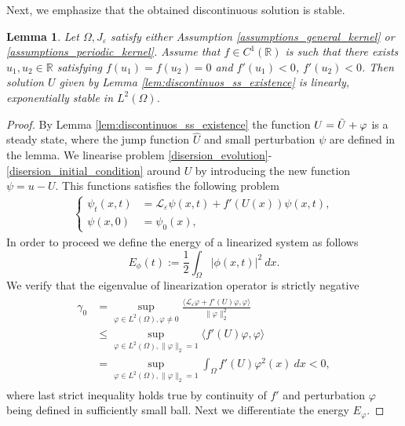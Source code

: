 \documentclass[12pt, a4paper]{article}
\theoremstyle{break}
\theoremstyle{break}
\theoremstyle{break}
\theoremstyle{break}
\newtheorem{lem}{Lemma}[section]
\theoremstyle{break}
\newcommand{\Leo}{\mathcal{L}_{\varepsilon}}
\newcommand{\Leb}{L^2\left(\Omega\right)}
\begin{document}
Next, we emphasize that the obtained discontinuous solution is stable.

\begin{lem}    
    Let $\Omega, J_\varepsilon$ satisfy either Assumption \ref{assumptions_general_kernel} or \ref{assumptions_periodic_kernel}. Assume that $f \in C^1(\mathbb{R})$ is such that there exists $u_1, u_2 \in \mathbb{R}$ satisfying $f(u_1) = f(u_2) = 0$ and $f'(u_1) < 0$, $f'(u_2) < 0$. Then solution $U$ given by Lemma \ref{lem:discontinuos_ss_existence} is linearly, exponentially stable in $L^2(\Omega)$.
    \label{lem:discontinuos_ss_stability}
\end{lem}

\begin{proof}
    By Lemma \ref{lem:discontinuos_ss_existence} the function $U = \Tilde{U} + \varphi$ is a steady state, where the jump function $\hat{U}$ and small perturbation $\psi$ are defined in the lemma. We linearise problem \eqref{disersion_evolution}-\eqref{disersion_initial_condition} around $U$ by introducing the new function $\psi = u - U$. This functions satisfies the following problem
    \begin{align*}
        \begin{cases}
            \psi_t(x,t) &= \Leo \psi(x,t) + f'(U(x))\psi(x,t), \\
            \psi(x,0) &= \psi_0(x),
        \end{cases}
    \end{align*}
    In order to proceed we define the energy of a linearized system as follows
    \begin{equation*}
        E_\phi(t) := \frac{1}{2} \int_\Omega |\phi(x,t)|^2 \:dx.
    \end{equation*}
    We verify that the eigenvalue of linearization operator is strictly negative
    \begin{align}
        \begin{split}
            \gamma_0 &= \sup_{\varphi \in \Leb, \varphi \neq 0} \frac{\langle \Leo \varphi + f'(U)\varphi, \varphi \rangle}{\|\varphi\|_2^2} \\
            &\leq \sup_{\varphi \in \Leb, \| \varphi \|_2 = 1} \langle f'(U)\varphi, \varphi \rangle \\
            &= \sup_{\varphi \in \Leb, \| \varphi \|_2 = 1} \int_\Omega f'(U) \varphi^2(x)\:dx < 0,
        \end{split}
        \label{gamma_0_negativity}
    \end{align}
    where last strict inequality holds true by continuity of $f'$ and perturbation $\varphi$ being defined in sufficiently small ball. Next we differentiate the energy $E_\varphi$.

\end{proof}
\end{document}
